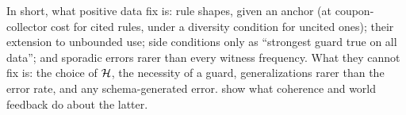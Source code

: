 In short, what positive data fix is: rule shapes, given an anchor (at coupon-collector cost for cited rules, under a diversity condition for uncited ones); their extension to unbounded use; side conditions only as ``strongest guard true on all data''; and sporadic errors rarer than every witness frequency. What they cannot fix is: the choice of $\mathcal{H}$, the necessity of a guard, generalizations rarer than the error rate, and any schema-generated error.  show what coherence and world feedback do about the latter.

